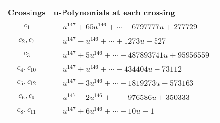\documentclass[1p]{elsarticle_modified}
\theoremstyle{definition}
\begin{document}
\begin{tabular}{m{50pt}|m{274pt}}
Crossings & \hspace{64pt}u-Polynomials at each crossing \\
\hline $$\begin{aligned}c_{1}\end{aligned}$$&$\begin{aligned}
&u^{147}+65 u^{146}+\cdots+6797777 u+277729
\end{aligned}$\\
\hline $$\begin{aligned}c_{2},c_{7}\end{aligned}$$&$\begin{aligned}
&u^{147}- u^{146}+\cdots+1273 u-527
\end{aligned}$\\
\hline $$\begin{aligned}c_{3}\end{aligned}$$&$\begin{aligned}
&u^{147}+5 u^{146}+\cdots-487893741 u+95956559
\end{aligned}$\\
\hline $$\begin{aligned}c_{4},c_{10}\end{aligned}$$&$\begin{aligned}
&u^{147}+u^{146}+\cdots-434404 u-73112
\end{aligned}$\\
\hline $$\begin{aligned}c_{5},c_{12}\end{aligned}$$&$\begin{aligned}
&u^{147}-3 u^{146}+\cdots-1819273 u-573163
\end{aligned}$\\
\hline $$\begin{aligned}c_{6},c_{9}\end{aligned}$$&$\begin{aligned}
&u^{147}-2 u^{146}+\cdots-976586 u+350333
\end{aligned}$\\
\hline $$\begin{aligned}c_{8},c_{11}\end{aligned}$$&$\begin{aligned}
&u^{147}+6 u^{146}+\cdots-10 u-1
\end{aligned}$\\
\hline
\end{tabular}\\~\\
\end{document}
